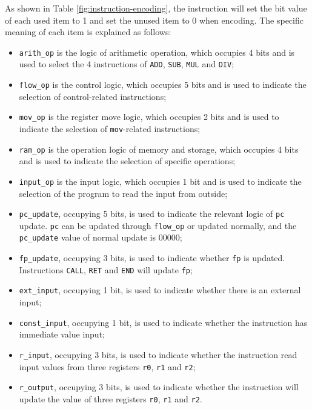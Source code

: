 As shown in Table \ref{fig:instruction-encoding}, the instruction will set the bit value of each used item to 1 and set the unused item to 0 when encoding. The specific meaning of each item is explained as follows:
\begin{itemize}
    \item \verb|arith_op| is the logic of arithmetic operation, which occupies 4 bits and is used to select the 4 instructions of \verb|ADD|, \verb|SUB|, \verb|MUL| and \verb|DIV|;
    \item \verb|flow_op| is the control logic, which occupies 5 bits and is used to indicate the selection of control-related instructions;
    \item \verb|mov_op| is the register move logic, which occupies 2 bits and is used to indicate the selection of \verb|mov|-related instructions;
    \item \verb|ram_op| is the operation logic of memory and storage, which occupies 4 bits and is used to indicate the selection of specific operations;
    \item \verb|input_op| is the input logic, which occupies 1 bit and is used to indicate the selection of the program to read the input from outside;
    \item \verb|pc_update|, occupying 5 bits, is used to indicate the relevant logic of \verb|pc| update. \verb|pc| can be updated through \verb|flow_op| or updated normally, and the \verb|pc_update| value of normal update is 00000;
    \item \verb|fp_update|, occupying 3 bits, is used to indicate whether \verb|fp| is updated. Instructions \verb|CALL|, \verb|RET| and \verb|END| will update \verb|fp|;
    \item \verb|ext_input|, occupying 1 bit, is used to indicate whether there is an external input;
    \item \verb|const_input|, occupying 1 bit, is used to indicate whether the instruction has immediate value input;
    \item \verb|r_input|, occupying 3 bits, is used to indicate whether the instruction read input values from three registers \verb|r0|, \verb|r1| and \verb|r2|;
    \item \verb|r_output|, occupying 3 bits, is used to indicate whether the instruction will update the value of three registers \verb|r0|, \verb|r1| and \verb|r2|.
\end{itemize}

